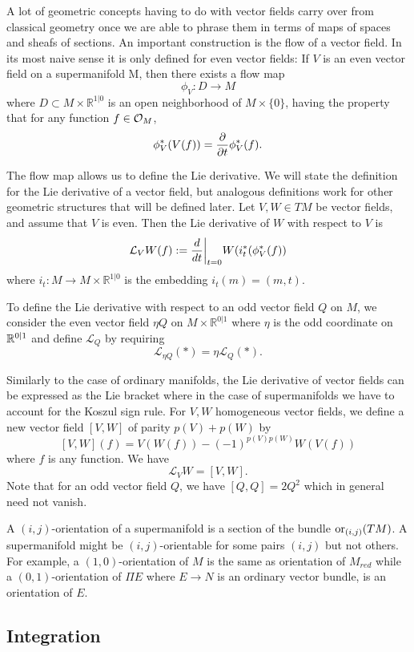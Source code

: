 \documentclass[11pt]{amsart}
\numberwithin{equation}{section}
\numberwithin{figure}{section}
\theoremstyle{plain}
\theoremstyle{definition}
\theoremstyle{remark}
\begin{document}
A lot of geometric concepts having to do with vector fields carry
over from classical geometry once we are able to phrase them in terms
of maps of spaces and sheafs of sections. An important construction
is the flow of a vector field. In its most naive sense it is only
defined for even vector fields: If $V$ is an even vector field on
a supermanifold M, then there exists a flow map 
\[
\phi_{V}:D\rightarrow M
\]
where $D\subset M\times\mathbb{R}^{1|0}$ is an open neighborhood
of $M\times\{0\}$, having the property that for any function $f\in\mathcal{O}_{M}$,
\[
\phi_{V}^{*}(V(f))=\frac{\partial}{\partial t}\phi_{V}^{*}(f).
\]


The flow map allows us to define the Lie derivative. We will state
the definition for the Lie derivative of a vector field, but analogous
definitions work for other geometric structures that will be defined
later. Let $V,W\in TM$ be vector fields, and assume that $V$ is
even. Then the Lie derivative of $W$ with respect to $V$ is 
\[
\mathcal{L}_{V}W(f):=\frac{d}{dt}\mbox{\ensuremath{\bigg|}}_{t=0}W(i_{t}^{*}(\phi_{V}^{*}(f))
\]
where $i_{t}:M\rightarrow M\times\mathbb{R}^{1|0}$ is the embedding
$i_{t}(m)=(m,t)$.

To define the Lie derivative with respect to an odd vector field $Q$
on $M$, we consider the even vector field $\eta Q$ on $M\times\mathbb{R}^{0|1}$
where $\eta$ is the odd coordinate on $\mathbb{R}^{0|1}$ and define $\mathcal{L}_{Q}$
by requiring 
\[
\mathcal{L}_{\eta Q}(*)=\eta\mathcal{L}_{Q}(*).
\]


Similarly to the case of ordinary manifolds, the Lie derivative of
vector fields can be expressed as the Lie bracket where in the case
of supermanifolds we have to account for the Koszul sign rule. For
$V,W$ homogeneous vector fields, we define a new vector field $[V,W]$
of parity $p(V)+p(W)$ by 
\[
[V,W](f)=V(W(f))-(-1)^{p(V)p(W)}W(V(f))
\]
where $f$ is any function. We have 
\[
\mathcal{L}_{V}W=[V,W].
\]
Note that for an odd vector field $Q$, we have $[Q,Q]=2Q^{2}$ which
in general need not vanish.

A $(i,j)$-orientation of a supermanifold is a section of the bundle
$\mathrm{or}_{(i,j)}(TM)$. A supermanifold might be $(i,j)$-orientable
for some pairs $(i,j)$ but not others. For example, a $(1,0)$-orientation
of $M$ is the same as orientation of $M_{red}$ while a $(0,1)$-orientation
of $\Pi E$ where $E\rightarrow N$ is an ordinary vector bundle,
is an orientation of $E$. 


\subsection{Integration}
\end{document}
